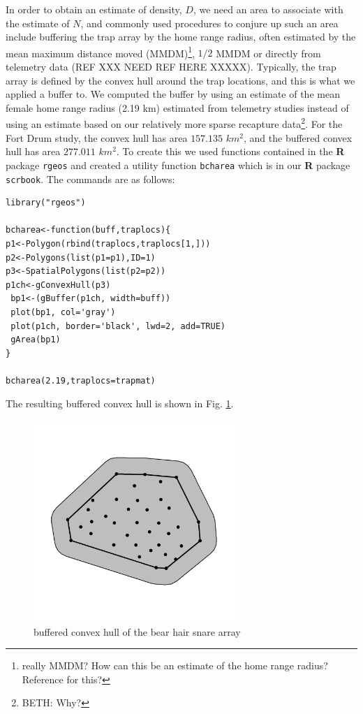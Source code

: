 In order to obtain an estimate of density, $D$, we need an area to
associate with the estimate of $N$, and commonly used procedures to
conjure up such an area include buffering the trap array by the home
range radius, often estimated by the mean maximum distance moved
(MMDM)\footnote{really MMDM? How can this be an estimate of the home
  range radius? Reference for this?}, $1/2$ MMDM \citep{dice:1938} or
directly from telemetry data (REF XXX NEED REF HERE XXXXX). Typically, the trap
array is defined by the convex hull around the trap locations, and
this is what we applied a buffer to. We computed the buffer by using
an estimate of the mean female home range radius (2.19 km) estimated from
telemetry studies \citep{bales_etal:2005} instead of using an estimate
based on our relatively more sparse recapture data\footnote{BETH:
  Why?}. 
 For the Fort Drum study, the convex hull has area
$157.135$ $km^2$, and the buffered convex hull has area $277.011$
$km^2$.
To create this we used functions contained in the {\bf R} package
\mbox{\tt rgeos} and created a utility function \mbox{\tt bcharea}
which is in our {\bf R} package \mbox{\tt scrbook}. The commands are
as follows:
\begin{verbatim}
library("rgeos")

bcharea<-function(buff,traplocs){
p1<-Polygon(rbind(traplocs,traplocs[1,]))
p2<-Polygons(list(p1=p1),ID=1)
p3<-SpatialPolygons(list(p2=p2))
p1ch<-gConvexHull(p3)
 bp1<-(gBuffer(p1ch, width=buff))
 plot(bp1, col='gray')
 plot(p1ch, border='black', lwd=2, add=TRUE)
 gArea(bp1)
}

bcharea(2.19,traplocs=trapmat)
\end{verbatim}
The resulting buffered convex hull is shown in Fig. \ref{closed.fig.bch}.
\begin{figure}
\begin{center}
\includegraphics[height=3in,width=3in]{figs/bufferedCH}
\end{center}
\caption{buffered convex hull of the bear hair snare array}
\label{closed.fig.bch}
\end{figure}

